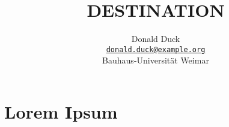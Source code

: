 \documentclass[b5paper]{book}
\theoremstyle{definition}
\theoremstyle{remark}
\begin{document}

\title{\textbf{%
    \Huge%
    {{DESTINATION}}
}}
\author{Donald Duck\\
  \normalsize \href{mailto:donald.duck@example.org}
    {\nolinkurl{donald.duck@example.org}} \\
  \vspace{3mm}
  \normalsize Bauhaus-Universit\"at Weimar\\
}

\maketitle

\tableofcontents


\chapter{Lorem Ipsum}
\lipsum[1-10]

\end{document}
